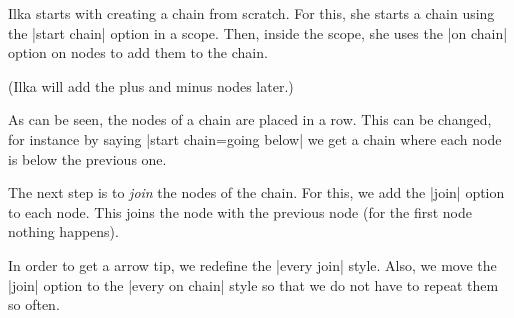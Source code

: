 Ilka starts with creating a chain from scratch. For this, she starts a
chain using the |start chain| option in a scope. Then, inside the
scope, she uses the |on chain| option on nodes to add them to the
chain.
\begin{codeexample}[]
\end{codeexample}
(Ilka will add the plus and minus nodes later.)

As can be seen, the nodes of a chain are placed in a row. This can be
changed, for instance by saying |start chain=going below| we get a
chain where each node is below the previous one.

The next step is to \emph{join} the nodes of the chain. For this, we
add the |join| option to each node. This joins the node with the
previous node (for the first node nothing happens).
\begin{codeexample}[]
\end{codeexample}
In order to get a arrow tip, we redefine the |every join| style. Also,
we move the |join| option to the |every on chain|
style so that we do not have to repeat them so often.
\begin{codeexample}[]
\end{codeexample}

